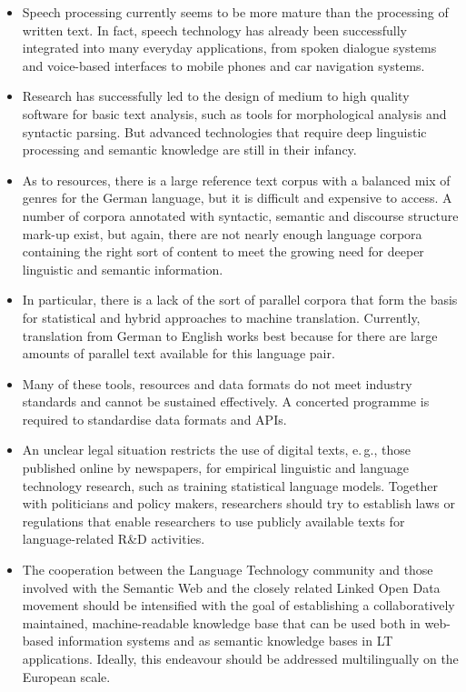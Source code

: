 \documentclass[]{../../metanetpaper}
\begin{document}
\begin{multicols}{2}
\begin{itemize}
\item Speech processing currently seems to be more mature than the processing of written text. In fact, speech technology has already been successfully integrated into many everyday applications, from spoken dialogue systems and voice-based interfaces to mobile phones and car navigation systems. 
\item Research has successfully led to the design of medium to high quality software for basic text analysis, such as tools for morphological analysis and syntactic parsing. But advanced technologies that require deep linguistic processing and semantic knowledge are still in their infancy. 
\item As to resources, there is a large reference text corpus with a balanced mix of genres for the German language, but it is difficult and expensive to access. A number of corpora annotated with syntactic, semantic and discourse structure mark-up exist, but again, there are not nearly enough language corpora containing the right sort of content to meet the growing need for deeper linguistic and semantic information. 
\item In particular, there is a lack of the sort of parallel corpora that form the basis for statistical and hybrid approaches to machine translation. Currently, translation from German to English works best because for there are large amounts of parallel text available for this language pair. 
\item Many of these tools, resources and data formats do not meet industry standards and cannot be sustained effectively. A concerted programme is required to standardise data formats and APIs.
\item An unclear legal situation restricts the use of digital texts, e.\,g., those published online by newspapers, for empirical linguistic and language technology research, such as training statistical language models. Together with politicians and policy makers, researchers should try to establish laws or regulations that enable researchers to use publicly available texts for language-related R\&D activities.
\item The cooperation between the Language Technology community and those involved with the Semantic Web and the closely related Linked Open Data movement should be intensified with the goal of establishing a collaboratively maintained, machine-readable knowledge base that can be used both in web-based information systems and as semantic knowledge bases in LT applications. Ideally, this endeavour should be addressed multilingually on the European scale.
\end{itemize}


\end{multicols}
\end{document}
